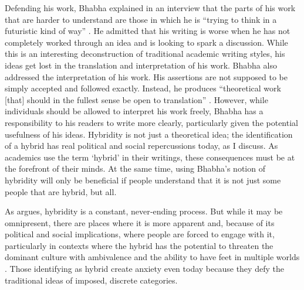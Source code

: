 	Defending his work, Bhabha explained in an interview that the parts of his work that are harder to understand are those in which he is “trying to think in a futuristic kind of way” \parencite  [82] {Mitchell_1995}. He admitted that his writing is worse when he has not completely worked through an idea and is looking to spark a discussion. While this is an interesting deconstruction of traditional academic writing styles, his ideas get lost in the translation and interpretation of his work. 
	Bhabha also addressed the interpretation of his work. His assertions are not supposed to be simply accepted and followed exactly.  Instead, he produces “theoretical work [that] should in the fullest sense be open to translation” \parencite  [82] {Mitchell_1995}. However, while individuals should be allowed to interpret his work freely, Bhabha has a responsibility to his readers to write more clearly, particularly given the potential usefulness of his ideas. Hybridity is not just a theoretical idea; the identification of a hybrid has real political and social repercussions today, as I discuss. As academics use the term ‘hybrid’ in their writings, these consequences must be at the forefront of their minds. At the same time, using Bhabha’s notion of hybridity will only be beneficial if people understand that it is not just some people that are hybrid, but all. 
	
	
	As  \textcite[52] {Bhabha_1994} 
	 argues, hybridity is a constant, never‐ending process. But while it may be omnipresent, there are places where it is more apparent and, because of its political and social implications, where people are forced to engage with it, particularly in contexts where the hybrid has the potential to threaten the dominant culture with ambivalence and the ability to have feet in multiple worlds \parencite [77] {Anzaldua_1987}. Those identifying as hybrid create anxiety even today because they defy the traditional ideas of imposed, discrete categories. 
	 
